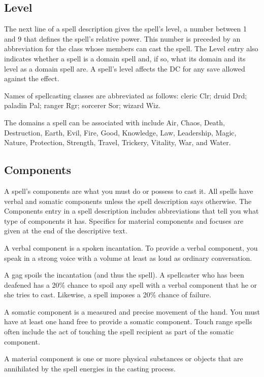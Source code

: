 \subsection{Level}
The next line of a spell description gives the spell's level, a number between 1 and 9 that defines the spell's relative power. This number is preceded by an abbreviation for the class whose members can cast the spell. The Level entry also indicates whether a spell is a domain spell and, if so, what its domain and its level as a domain spell are. A spell's level affects the DC for any save allowed against the effect.

Names of spellcasting classes are abbreviated as follows: cleric Clr; druid Drd; paladin Pal; ranger Rgr; sorcerer Sor; wizard Wiz.

The domains a spell can be associated with include Air, Chaos, Death, Destruction, Earth, Evil, Fire, Good, Knowledge, Law, Leadership, Magic, Nature, Protection, Strength, Travel, Trickery, Vitality, War, and Water.

\subsection{Components}
A spell's components are what you must do or possess to cast it. All spells have verbal and somatic components unless the spell description says otherwise. The Components entry in a spell description includes abbreviations that tell you what type of components it has. Specifics for material components and focuses are given at the end of the descriptive text.

 A verbal component is a spoken incantation. To provide a verbal component, you speak in a strong voice with a volume at least as loud as ordinary conversation.

A gag spoils the incantation (and thus the spell). A spellcaster who has been deafened has a 20\% chance to spoil any spell with a verbal component that he or she tries to cast. Likewise, a  spell imposes a 20\% chance of failure.

 A somatic component is a measured and precise movement of the hand. You must have at least one hand free to provide a somatic component. Touch range spells often include the act of touching the spell recipient as part of the somatic component.

 A material component is one or more physical substances or objects that are annihilated by the spell energies in the casting process.

